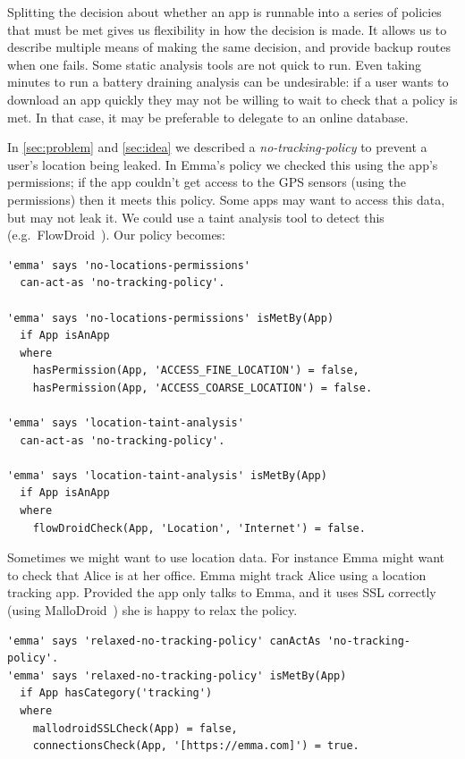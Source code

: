 \documentclass[]{llncs}
\begin{document}
Splitting the decision about whether an app is runnable into a series of policies that must be met gives us flexibility in how the decision is made.
It allows us to describe multiple means of making the same decision, and provide backup routes when one fails.
Some static analysis tools are not quick to run.
Even taking minutes to run a battery draining analysis can be undesirable:
if a user wants to download an app quickly they may not be willing to wait to check that a policy is met.
In that case, it may be preferable to delegate to an online database.

In \autoref{sec:problem} and \autoref{sec:idea} we described a \emph{no-tracking-policy} to prevent a user's location being leaked.
In Emma's policy we checked this using the app's permissions;
if the app couldn't get access to the GPS sensors (using the permissions) then it meets this policy.
Some apps may want to access this data, but may not leak it.
We could use a taint analysis tool to detect this (e.g.~FlowDroid~\cite{Arzt:2014kf,Li:2015wo}).
Our policy becomes:

\begin{lstlisting}
'emma' says 'no-locations-permissions'
  can-act-as 'no-tracking-policy'.

'emma' says 'no-locations-permissions' isMetBy(App)
  if App isAnApp
  where
    hasPermission(App, 'ACCESS_FINE_LOCATION') = false,
    hasPermission(App, 'ACCESS_COARSE_LOCATION') = false.

'emma' says 'location-taint-analysis'
  can-act-as 'no-tracking-policy'.

'emma' says 'location-taint-analysis' isMetBy(App)
  if App isAnApp
  where
    flowDroidCheck(App, 'Location', 'Internet') = false.
\end{lstlisting}

Sometimes we might want to use location data.
For instance Emma might want to check that Alice is at her office.
Emma might track Alice using a location tracking app.
Provided the app only talks to Emma, and it uses SSL correctly (using MalloDroid~\cite{Fahl:2012dj}) she is happy to relax the policy.

\begin{lstlisting}
'emma' says 'relaxed-no-tracking-policy' canActAs 'no-tracking-policy'.
'emma' says 'relaxed-no-tracking-policy' isMetBy(App)
  if App hasCategory('tracking')
  where
    mallodroidSSLCheck(App) = false,
    connectionsCheck(App, '[https://emma.com]') = true.
\end{lstlisting}
\end{document}

